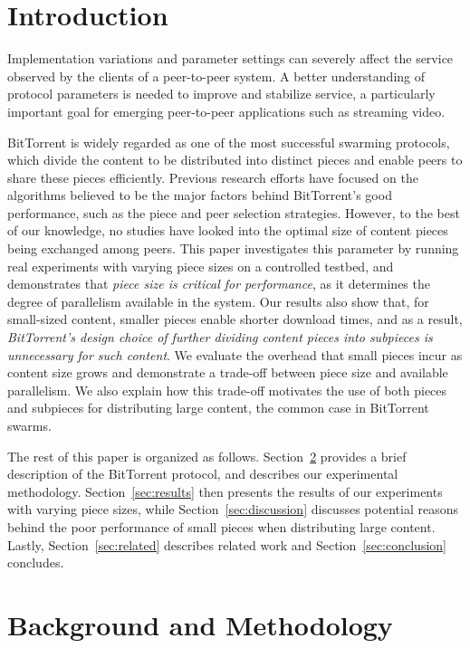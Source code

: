 \documentclass[twocolumn,letterpaper,11pt]{article}
\begin{document}
\section{Introduction}

Implementation variations and parameter settings can severely affect the
service observed by the clients of a peer-to-peer system. 
A better understanding of protocol parameters is
needed to improve and stabilize service, a particularly
important goal for emerging peer-to-peer applications such as streaming video.

BitTorrent is widely regarded as one of the most successful swarming protocols,
which divide the content to be distributed into distinct pieces and enable peers 
to share these pieces efficiently. Previous research efforts
have focused on the algorithms 
believed to be the major factors behind BitTorrent's good performance, such as the 
piece and peer selection strategies. 
However, to the best of our knowledge, no studies have looked into the optimal 
size of content pieces being exchanged among peers.
This paper investigates this parameter by running real experiments with 
varying piece sizes on a controlled testbed, and demonstrates that \emph{piece size 
is critical for performance}, as it determines the degree of parallelism available 
in the system.
Our results also show that, for small-sized content, smaller pieces enable
shorter download times, and as a result, \emph{BitTorrent's design choice of further 
dividing content pieces into subpieces is unnecessary for such content}.
We evaluate the overhead that small pieces incur as content size grows and 
demonstrate a trade-off between piece size and available 
parallelism. We also explain how this trade-off motivates
the use of both pieces and subpieces for distributing large content, the common case 
in BitTorrent swarms.

The rest of this paper is organized as follows. Section~\ref{sec:methodology} 
provides a brief description of the BitTorrent protocol, and describes our 
experimental methodology. Section~\ref{sec:results} then presents the results 
of our experiments with varying piece sizes, while Section~\ref{sec:discussion} 
discusses potential reasons behind the poor performance of small pieces when distributing 
large content.
Lastly, Section~\ref{sec:related} describes related work and 
Section~\ref{sec:conclusion} concludes.


\section{Background and Methodology}
\label{sec:methodology}
\end{document}

